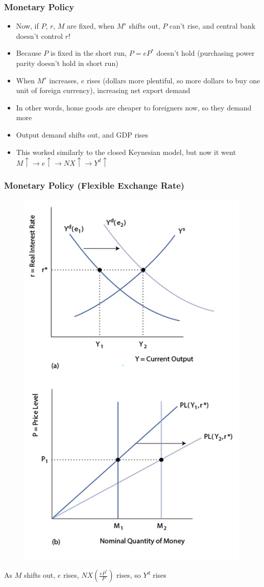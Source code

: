 \documentclass{beamer}
\begin{document}
\begin{frame}
\frametitle[alignment=center]{Monetary Policy}
\begin{itemize}
\item Now, if $P$, $r$, $M$ are fixed, when $M^s$ shifts out, $P$ can't rise, and central bank doesn't control $r$!
\bigskip
\item Because $P$ is fixed in the short run, $P=eP^*$ doesn't hold (purchasing power parity doesn't hold in short run)
\bigskip
\item When $M^s$ increases, $e$ rises (dollars more plentiful, so more dollars to buy one unit of foreign currency), increasing net export demand
\bigskip
\item In other words, home goods are cheaper to foreigners now, so they demand more
\bigskip
\item Output demand shifts out, and GDP rises
\bigskip
\item This worked similarly to the closed Keynesian model, but now it went $M\uparrow\rightarrow e\uparrow \rightarrow NX\uparrow\rightarrow Y^d\uparrow$
\end{itemize}
\end{frame}


\begin{frame}
\frametitle[alignment=center]{Monetary Policy (Flexible Exchange Rate)}
\begin{figure}
\centering
\includegraphics[scale=0.55]{Figures/W_Fig_17pt14.png}
\end{figure}
As $M$ shifts out, $e$ rises, $NX\left(\frac{eP^*}{P}\right)$ rises, so $Y^d$ rises
\end{frame}
\end{document}
